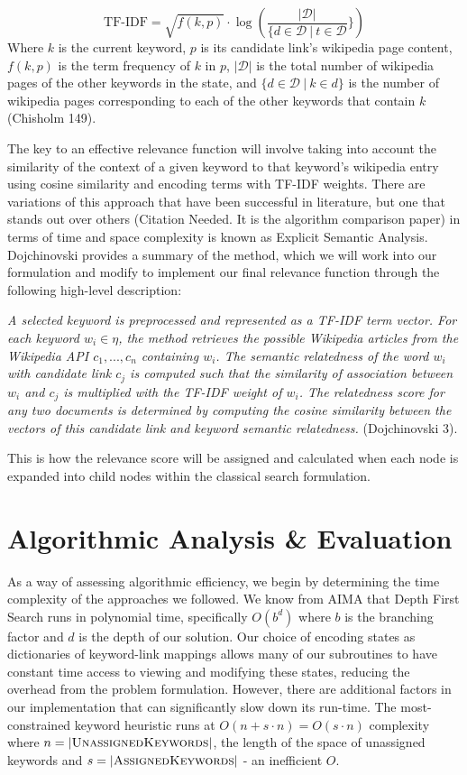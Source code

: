 \documentclass[twoside,11pt]{article}
\begin{document}
$$\mbox{TF-IDF} = \sqrt{f(k, p)} \cdot \log(\frac{|\mathcal{D}|}{\{d \in \mathcal{D} \ | \ t \in \mathcal{D}}\})$$
Where $k$ is the current keyword, $p$ is its candidate link's wikipedia page content, $f(k,p)$ is the term frequency of $k$ in $p$, $|\mathcal{D}|$ is the total number of wikipedia pages of the other keywords in the state, and $\{d \in \mathcal{D} \ | \ k \in d\}$ is the number of wikipedia pages corresponding to each of the other keywords that contain $k$ (Chisholm 149).

The key to an effective relevance function will involve taking into account the similarity of the context of a given keyword to that keyword’s wikipedia entry using cosine similarity and encoding terms with TF-IDF weights. There are variations of this approach that have been successful in literature, but one that stands out over others (Citation Needed. It is the algorithm comparison paper) in terms of time and space complexity is known as Explicit Semantic Analysis. Dojchinovski provides a summary of the method, which we will work into our formulation and modify to implement our final relevance function through the following high-level description:

\textit{A selected keyword is preprocessed and represented as a TF-IDF term vector. For each keyword $w_i \in \eta$, the method retrieves the possible Wikipedia articles from the Wikipedia API $c_1,... ,c_n$ containing $w_i$. The semantic relatedness of the word $w_i$ with candidate link $c_j$ is computed such that the similarity of association between $w_i$ and $c_j$ is multiplied with the TF-IDF weight of $w_i$. The relatedness score for any two documents is determined by computing the cosine similarity between the vectors of this candidate link and keyword semantic relatedness.} (Dojchinovski 3).

This is how the relevance score will be assigned and calculated when each node is expanded into child nodes within the classical search formulation.

\section{Algorithmic Analysis \& Evaluation}
As a way of assessing algorithmic efficiency, we begin by determining the time complexity of the approaches we followed. We know from AIMA that Depth First Search runs in polynomial time, specifically $O(b^d)$ where $b$ is the branching factor and $d$ is the depth of our solution. Our  choice of encoding states as dictionaries of keyword-link mappings allows many of our subroutines to have constant time access to viewing and modifying these states, reducing the overhead from the problem formulation. However, there are additional factors in our implementation that can significantly slow down its run-time. The most-constrained keyword heuristic runs at $O(n + s\cdot n) = O(s\cdot n)$ complexity where $n = |\mbox{{\sc UnassignedKeywords}}|$, the length of the space of unassigned keywords and $s = |\mbox{{\sc AssignedKeywords}}|$ - an inefficient $O$.
\end{document}
